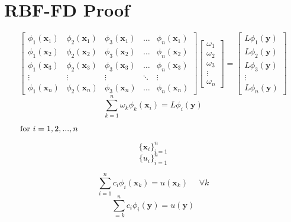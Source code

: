 \documentclass[12pt]{article}
\let\vec\mathbf
\begin{document}
\section{RBF-FD Proof}
$$
\begin{bmatrix}
	\phi_1(\vec{x}_1) & \phi_2(\vec{x}_1) & \phi_3(\vec{x}_1) & \dots & \phi_n(\vec{x}_1) \\
	\phi_1(\vec{x}_2) & \phi_2(\vec{x}_2) & \phi_3(\vec{x}_2) & \dots & \phi_n(\vec{x}_2) \\
	\phi_1(\vec{x}_3) & \phi_2(\vec{x}_3) & \phi_3(\vec{x}_3) & \dots & \phi_n(\vec{x}_3) \\
	\vdots 		& \vdots 	  & \vdots 		& \ddots& \vdots \\
	\phi_1(\vec{x}_n) & \phi_2(\vec{x}_n) & \phi_3(\vec{x}_n) & \dots & \phi_n(\vec{x}_n)
\end{bmatrix}
\begin{bmatrix}
	\omega_1 \\ \omega_2 \\ \omega_3 \\ \vdots \\ \omega_n
\end{bmatrix}
=
\begin{bmatrix}
	L\phi_1(\vec{y}) \\ L\phi_2(\vec{y}) \\ L\phi_3(\vec{y}) \\ \vdots \\ L\phi_n(\vec{y})
\end{bmatrix}
$$
$$
\sum_{k=1}^n \omega_k\phi_k(\vec{x}_i) = L\phi_i(\vec{y}) 
$$

$\text{\phantom{==} for } i=1,2,...,n$

$$
\{\vec{x}_i\}_{i=1}^n
$$
$$
\{u_i\}_{i=1}^n
$$

$$
\sum_{i=1}^n c_i \phi_i(\vec{x}_k) = u(\vec{x}_k) \phantom{=} \forall k
$$
$$
\sum_{=k}^n c_i \phi_i(\vec{y}) = u(\vec{y})
$$
\end{document}

